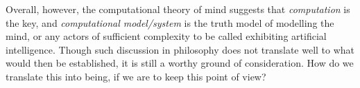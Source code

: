 Overall, however, the computational theory of mind suggests that \textit{computation} is the key, and \textit{computational model/system} is the truth model of modelling the mind, or any actors of sufficient complexity to be called exhibiting artificial intelligence. Though such discussion in philosophy does not translate well to what would then be established, it is still a worthy ground of consideration. How do we translate this into being, if we are to keep this point of view? 

